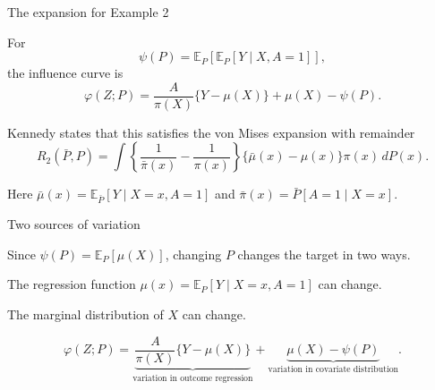 \documentclass[xcolor={table}, handout]{beamer}
\begin{document}
\note{
\scriptsize \singlespacing

}
\begin{frame}{The expansion for Example 2}

\small

\begin{wideitemize}
\item For
\[
\psi(P)=\mathbb{E}_P[\mathbb{E}_P[Y\mid X,A=1]],
\]
the influence curve is
\[
\varphi(Z;P)
  =
  \frac{A}{\pi(X)}\{Y-\mu(X)\}
  +
  \mu(X)-\psi(P).
\]\pause
\item Kennedy states that this satisfies the von Mises expansion with remainder
\[
R_2(\bar P,P)
  =
  \int
  \left\{
    \frac{1}{\bar\pi(x)}
    -
    \frac{1}{\pi(x)}
  \right\}
  \{\bar\mu(x)-\mu(x)\}
  \pi(x)\,dP(x).
\]\pause
\item Here $\bar\mu(x)=\mathbb{E}_{\bar P}[Y\mid X=x,A=1]$ and $\bar\pi(x)=\bar P[A=1\mid X=x]$.
\end{wideitemize}

\end{frame}

\note{
\scriptsize \singlespacing

}
\begin{frame}{Two sources of variation}

\small

\begin{wideitemize}
\item Since $\psi(P)=\mathbb{E}_P[\mu(X)]$, changing $P$ changes the target in two ways.\pause
\item The regression function $\mu(x)=\mathbb{E}_P[Y\mid X=x,A=1]$ can change.\pause
\item The marginal distribution of $X$ can change.\pause
\end{wideitemize}

\[
\varphi(Z;P)
  =
  \underbrace{
    \frac{A}{\pi(X)}\{Y-\mu(X)\}
  }_{\text{variation in outcome regression}}
  +
  \underbrace{
    \mu(X)-\psi(P)
  }_{\text{variation in covariate distribution}}.
\]

\end{frame}
\end{document}

